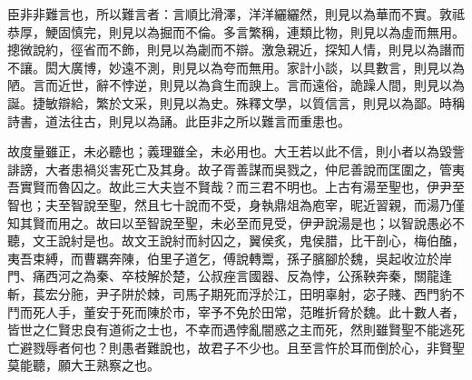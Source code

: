 
\begin{pinyinscope}
臣非非難言也，所以難言者：言順比滑澤，洋洋纚纚然，則見以為華而不實。敦祗恭厚，鯁固慎完，則見以為掘而不倫。多言繁稱，連類比物，則見以為虛而無用。摠微說約，徑省而不飾，則見以為劌而不辯。激急親近，探知人情，則見以為譖而不讓。閎大廣博，妙遠不測，則見以為夸而無用。家計小談，以具數言，則見以為陋。言而近世，辭不悖逆，則見以為貪生而諛上。言而遠俗，詭躁人間，則見以為誕。捷敏辯給，繁於文采，則見以為史。殊釋文學，以質信言，則見以為鄙。時稱詩書，道法往古，則見以為誦。此臣非之所以難言而重患也。

故度量雖正，未必聽也；義理雖全，未必用也。大王若以此不信，則小者以為毀訾誹謗，大者患禍災害死亡及其身。故子胥善謀而吳戮之，仲尼善說而匡圍之，管夷吾實賢而魯囚之。故此三大夫豈不賢哉？而三君不明也。上古有湯至聖也，伊尹至智也；夫至智說至聖，然且七十說而不受，身執鼎俎為庖宰，昵近習親，而湯乃僅知其賢而用之。故曰以至智說至聖，未必至而見受，伊尹說湯是也；以智說愚必不聽，文王說紂是也。故文王說紂而紂囚之，翼侯炙，鬼侯腊，比干剖心，梅伯醢，夷吾束縛，而曹羈奔陳，伯里子道乞，傅說轉鬻，孫子臏腳於魏，吳起收泣於岸門、痛西河之為秦、卒枝解於楚，公叔痤言國器、反為悖，公孫鞅奔秦，關龍逢斬，萇宏分胣，尹子阱於棘，司馬子期死而浮於江，田明辜射，宓子賤、西門豹不鬥而死人手，董安于死而陳於市，宰予不免於田常，范睢折脅於魏。此十數人者，皆世之仁賢忠良有道術之士也，不幸而遇悖亂闇惑之主而死，然則雖賢聖不能逃死亡避戮辱者何也？則愚者難說也，故君子不少也。且至言忤於耳而倒於心，非賢聖莫能聽，願大王熟察之也。


\end{pinyinscope}